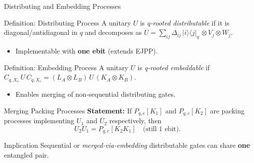 \documentclass{beamer}
\begin{document}
	
%		
	
	\begin{frame}{Distributing and Embedding Processes}
		\begin{block}{Definition: Distributing Process}
			A unitary $U$ is \emph{q‑rooted distributable} if it is diagonal/antidiagonal in $q$ and decomposes as
			$U = \sum_{ij} \Delta_{ij}\,|i\rangle\!\langle j|_q\,\otimes V_j\otimes W_j$.
			\begin{itemize}
				\item Implementable with \textbf{one ebit} (extends EJPP).
			\end{itemize}
		\end{block}
		\vspace{.5em}
		\begin{block}{Definition: Embedding Process}
			A unitary $U$ is \emph{q‑rooted embeddable} if
			$C_{q,X_e}\,U\,C_{q,X_e} = (L_A\otimes L_B)\,U\,(K_A\otimes K_B)$.
			\begin{itemize}
				\item Enables merging of non‑sequential distributing gates.
			\end{itemize}
		\end{block}
	\end{frame}

	
	\begin{frame}{Merging Packing Processes}
		\textbf{Statement:}
		If $P_{q,e}[K_1]$ and $P_{q,e}[K_2]$ are packing processes implementing $U_1$ and $U_2$ respectively, then
		\[
		U_2U_1 = P_{q,e}[K_2K_1]\quad\text{(still 1 ebit)}.
		\]
		\pause
		\begin{block}{Implication}
			Sequential or \emph{merged‑via‑embedding} distributable gates can share \textbf{one} entangled pair.
		\end{block}
	\end{frame}
	
\end{document}
